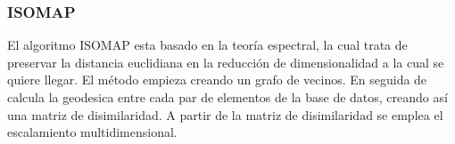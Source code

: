 \subsubsection{ISOMAP \label{sec:isomap_theory}}

El algoritmo ISOMAP esta basado en la teoría espectral, la cual trata de preservar la distancia euclidiana en la reducción de dimensionalidad a la cual se quiere llegar. El método empieza creando un grafo de vecinos. En seguida de calcula la geodesica entre cada par de elementos de la base de datos, creando así una matriz de disimilaridad. A partir de la matriz de disimilaridad se emplea el escalamiento multidimensional.